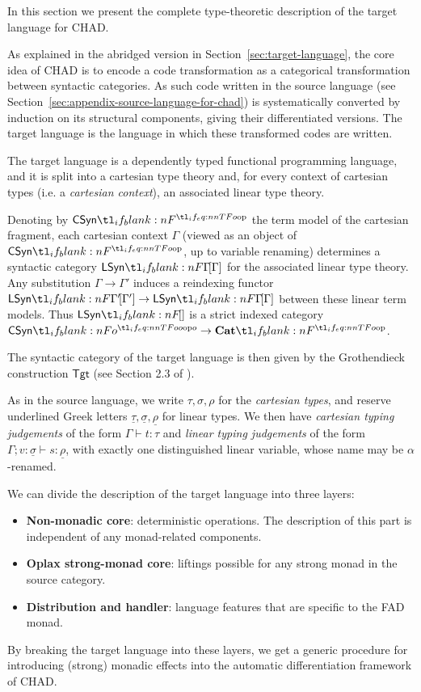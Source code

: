 \documentclass[11pt,a4paper]{article}
\theoremstyle{definition}
\theoremstyle{remark}
\providecommand{\lintype}[1]{\underline{#1}}
\providecommand{\Tgt}{\mathsf{Tgt}}
\begin{document}
In this section we present the complete type-theoretic description of the target language for CHAD.

As explained in the abridged version in Section~\ref{sec:target-language}, the core idea of CHAD is to encode a code transformation as a categorical transformation between syntactic categories. As such code written in the source language (see Section~\ref{sec:appendix-source-language-for-chad}) is systematically converted by induction on its structural components, giving their differentiated versions. The target language is the language in which these transformed codes are written.

The target language is a dependently typed functional programming language, and it is split into a cartesian type theory and, for every context of cartesian types (i.e. a \emph{cartesian context}), an associated linear type theory.

Denoting by \( \CSyn \) the term model of the cartesian fragment, each cartesian context \( \Gamma \) (viewed as an object of \( \CSyn \), up to variable renaming) determines a syntactic category \( \LSyn[\Gamma] \) for the associated linear type theory. Any substitution \( \Gamma \to \Gamma' \) induces a reindexing functor \( \LSyn[\Gamma'] \to \LSyn[\Gamma] \) between these linear term models. Thus \( \LSyn \) is a strict indexed category \( \CSyn[o] \to \Cat \).

The syntactic category of the target language is then given by the Grothendieck construction \( \Tgt \) (see Section 2.3 of \cite{lucatellinunesCHADExpressiveTotal2023}).

As in the source language, we write \( \tau, \sigma, \rho \) for the \emph{cartesian types}, and reserve underlined Greek letters \( \lintype{\tau}, \lintype{\sigma}, \lintype{\rho} \) for linear types. We then have \emph{cartesian typing judgements} of the form \( \Gamma \vdash t : \tau \) and \emph{linear typing judgements} of the form \( \Gamma ; v : \lintype{\sigma} \vdash s : \lintype{\rho} \), with exactly one distinguished linear variable, whose name may be \(\alpha\)-renamed.

We can divide the description of the target language into three layers:
\begin{itemize}
\item \textbf{Non-monadic core}: deterministic operations. The description of this part is independent of any monad-related components.
\item \textbf{Oplax strong-monad core}: liftings possible for any strong monad in the source category.
\item \textbf{Distribution and handler}: language features that are specific to the FAD monad.
\end{itemize}
By breaking the target language into these layers, we get a generic procedure for introducing (strong) monadic effects into the automatic differentiation framework of CHAD.
\end{document}
